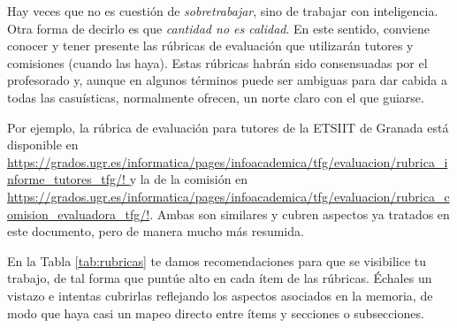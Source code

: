 Hay veces que no es cuestión de \textit{sobretrabajar}, sino de trabajar con inteligencia. Otra forma de decirlo es que {\it cantidad no es calidad}. En este sentido, conviene conocer y tener presente las rúbricas de evaluación que utilizarán tutores y comisiones (cuando las haya). Estas rúbricas habrán sido consensuadas por el profesorado y, aunque en algunos términos puede ser ambiguas para dar cabida a todas las casuísticas, normalmente ofrecen, un norte claro con el que guiarse.  

Por ejemplo, la rúbrica de evaluación para tutores de la ETSIIT de Granada está disponible en \url{https://grados.ugr.es/informatica/pages/infoacademica/tfg/evaluacion/rubrica_informe_tutores_tfg/! } y la de la comisión en \url{https://grados.ugr.es/informatica/pages/infoacademica/tfg/evaluacion/rubrica_comision_evaluadora_tfg/!}. Ambas son similares y cubren aspectos ya tratados en este documento, pero de manera mucho más resumida.

En la Tabla \ref{tab:rubricas} te damos recomendaciones para que se visibilice tu trabajo, de tal forma que puntúe alto en cada ítem de las rúbricas. Échales un vistazo e intentas cubrirlas reflejando los aspectos asociados en la memoria, de modo que haya casi un mapeo directo entre ítems y secciones o subsecciones.

